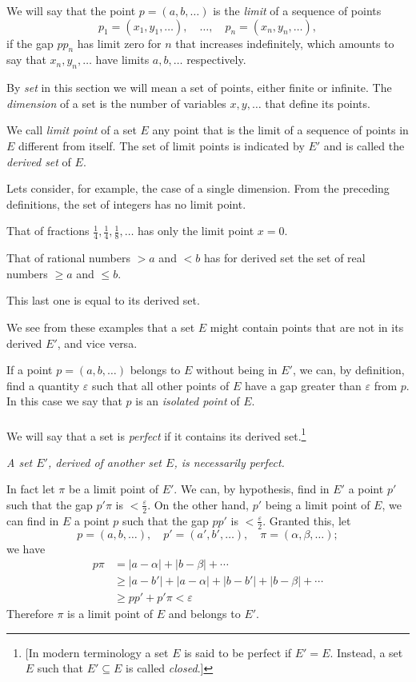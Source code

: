 \documentclass[10pt,letterpaper]{book}
\renewcommand\epsilon{\varepsilon}
\theoremstyle{definition}
\begin{document}
We will say that the point $p=(a,b,\dots)$ is the \textit{limit} of a sequence of points
\[
  p_1=(x_1,y_1,\dots),
  \quad\dots,\quad
  p_n=(x_n,y_n,\dots),
\]
if the gap $pp_n$ has limit zero for $n$ that increases indefinitely, which amounts to say that $x_n,y_n,\dots$ have limits $a,b,\dots$ respectively.


By \textit{set} in this section we will mean a set of points, either finite or infinite. The \textit{dimension} of a set is the number of variables $x, y, \dots$ that define its points.

We call \textit{limit point} of a set $E$ any point that is the limit of a sequence of points in $E$ different from itself. The set of limit points is indicated by $E'$ and is called the \textit{derived set} of $E$.

Lets consider, for example, the case of a single dimension. From the preceding definitions, the set of integers has no limit point.

That of fractions $\frac 1 4,\frac 1 4, \frac 1 8,\dots$ has only the limit point $x=0$.

That of rational numbers $>a$ and $<b$ has for derived set the set of real numbers $\geq a$ and $\leq b$.

This last one is equal to its derived set.

We see from these examples that a set $E$ might contain points that are not in its derived $E'$, and vice versa.

If a point $p=(a,b,\dots)$ belongs to $E$ without being in $E'$, we can, by definition, find a quantity $\epsilon$ such that all other points of $E$ have a gap greater than $\epsilon$ from $p$. In this case we say that $p$ is an \textit{isolated point} of $E$.

\paragraph{} We will say that a set is \textit{perfect} if it contains its derived set.\footnote{[In modern terminology a set $E$ is said to be perfect if $E'=E$. Instead, a set $E$ such that $E'\subseteq E$ is called \textit{closed}.]}

\textit{A set $E'$, derived of another set $E$, is necessarily perfect.}

In fact let $\pi$ be a limit point of $E'$. We can, by hypothesis, find in $E'$ a point $p'$ such that the gap $p'\pi$ is $<\frac\epsilon 2$. On the other hand, $p'$ being a limit point of $E$, we can find in $E$ a point $p$ such that the gap $pp'$ is $<\frac\epsilon 2$. Granted this, let
\[
  p=(a,b,\dots),\quad p'=(a',b',\dots),\quad \pi=(\alpha,\beta,\dots);
\]
we have
\begin{align*}
  p\pi &=    |a-\alpha| + |b-\beta| + \cdots \\
       &\geq |a-b'| + |a-\alpha| + |b-b'| + |b-\beta| + \cdots \\
       &\geq pp' + p'\pi < \epsilon
\end{align*}
Therefore $\pi$ is a limit point of $E$ and belongs to $E'$.
\end{document}
